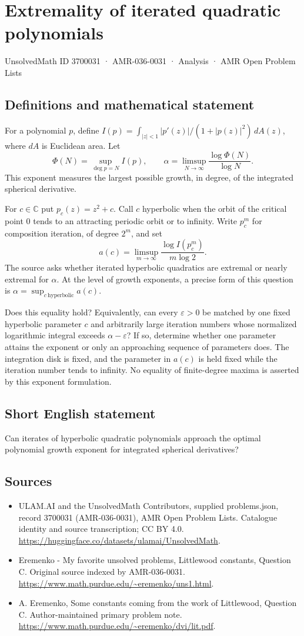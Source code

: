 \documentclass[11pt,a4paper]{article}
\begin{document}
\section*{Extremality of iterated quadratic polynomials}\label{3700031}
{\small UnsolvedMath ID 3700031 · AMR-036-0031 · Analysis · AMR Open Problem Lists}
\subsection{Definitions and mathematical statement}
For a polynomial $p$, define
$I(p)=\int_{|z|<1}|p'(z)|/(1+|p(z)|^2)\,dA(z)$,
where $dA$ is Euclidean area. Let
\[
 \Phi(N)=\sup_{\deg p=N}I(p),\qquad
 \alpha=\limsup_{N\to\infty}\frac{\log\Phi(N)}{\log N}.
\]
This exponent measures the largest possible growth,
in degree, of the integrated spherical derivative.

For $c\in\mathbb C$ put $p_c(z)=z^2+c$.
Call $c$ hyperbolic when the orbit of the critical
point $0$ tends to an attracting periodic orbit
or to infinity. Write $p_c^m$ for composition
iteration, of degree $2^m$, and set
\[
 a(c)=\limsup_{m\to\infty}
                    \frac{\log I(p_c^m)}{m\log2}.
\]
The source asks whether iterated hyperbolic quadratics
are extremal or nearly extremal for $\alpha$.
At the level of growth exponents, a precise form
of this question is
$\alpha=\sup_{c\ \mathrm{hyperbolic}}a(c)$.

Does this equality hold? Equivalently, can every
$\varepsilon>0$ be matched by one fixed hyperbolic
parameter $c$ and arbitrarily large iteration numbers
whose normalized logarithmic integral exceeds
$\alpha-\varepsilon$? If so, determine whether one
parameter attains the exponent or only an approaching
sequence of parameters does.
The integration disk is fixed, and the parameter
in $a(c)$ is held fixed while the iteration number
tends to infinity. No equality of finite-degree
maxima is asserted by this exponent formulation.
\subsection{Short English statement}
Can iterates of hyperbolic quadratic polynomials approach the optimal polynomial growth exponent for integrated spherical derivatives?
\subsection{Sources}
\begin{itemize}
\item[S1] ULAM.AI and the UnsolvedMath Contributors, supplied problems.json, record 3700031 (AMR-036-0031), AMR Open Problem Lists. Catalogue identity and source transcription; CC BY 4.0.
\url{https://huggingface.co/datasets/ulamai/UnsolvedMath}.
\item[S2] Eremenko - My favorite unsolved problems, Littlewood constants, Question C. Original source indexed by AMR-036-0031.
\url{https://www.math.purdue.edu/~eremenko/uns1.html}.
\item[S3] A. Eremenko, Some constants coming from the work of Littlewood, Question C. Author-maintained primary problem note.
\url{https://www.math.purdue.edu/~eremenko/dvi/lit.pdf}.
\end{itemize}
\end{document}
